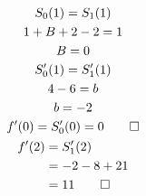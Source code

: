 \documentclass[12pt]{article}
\newenvironment{problem}[2][Problem]{\begin{trivlist}
\item[\hskip \labelsep {\bfseries #1}\hskip \labelsep {\bfseries #2.}]}{\end{trivlist}}
\begin{document}
\begin{problem}{6}
\end{problem}
\begin{gather*}
	S_0(1) = S_1(1) \\
	1 + B + 2 - 2 = 1 \\
	B = 0 \\
	S_0'(1) = S_1'(1) \\
	4 - 6 = b \\
	b = -2 \\
	f'(0) = S_0'(0) = 0 \qed \\
	\begin{aligned}
		f'(2) &= S_1'(2) \\
		&= -2 - 8 + 21 \\
		&= 11 \qed \\
	\end{aligned}
\end{gather*}
\end{document}

